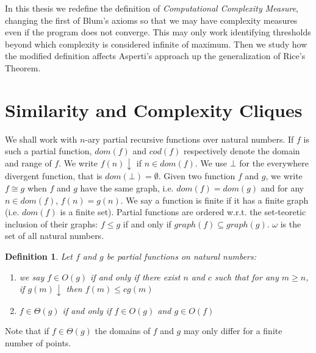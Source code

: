 \documentclass[10pt, a4paper, oneside, titlepage, draft]{article}
\newtheorem{definition}[shrd]{Definition}
\begin{document}
In this thesis we redefine the definition of \textit{Computational Complexity Measure}, changing the first of Blum's axioms so that we may have complexity measures even if the program does not converge. This may only work identifying thresholds beyond which complexity is considered infinite of maximum. Then we study how the modified definition affects Asperti's approach up the generalization of Rice's Theorem.

\section{Similarity and Complexity Cliques}
We shall work with $n$-ary partial recursive functions over natural numbers. If $f$ is such a partial function, $dom(f)$ and $cod(f)$ respectively denote the domain and range of $f$. We write $f(n)\downarrow$ if $n \in dom(f)$. We use $\bot$ for the everywhere divergent function, that is $dom(\bot) = \emptyset$. Given two function $f$ and $g$, we write $f \cong g$ when $f$ and $g$ have the same graph, i.e. $dom(f)=dom(g)$ and for any $n \in dom(f)$, $f(n)=g(n)$. We say a function is finite if it has a finite graph (i.e. $dom(f)$ is a finite set). Partial functions are ordered w.r.t. the set-teoretic inclusion of their graphs: $f \le g$ if and only if $graph(f) \subseteq graph(g)$. $\omega$ is the set of all natural numbers.

\begin{definition}
    Let $f$ and $g$ be partial functions on natural numbers:
    \begin{enumerate}
        \item we say $f \in O(g)$ if and only if there exist $n$ and $c$ such that for any $m \ge n$, if $g(m)\downarrow$ then $f(m) \le cg(m)$
        \item $f \in \Theta(g)$ if and only if $f \in O(g)$ and $g \in O(f)$
    \end{enumerate}
\end{definition}

Note that if $f \in \Theta(g)$ the domains of $f$ and $g$ may only differ for a finite number of points.

\newpage
\end{document}
